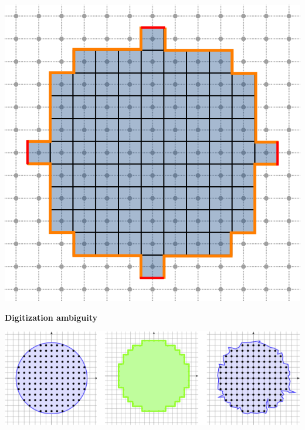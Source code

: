 \begin{frame}
\begin{minipage}{0.3\textwidth}
\includegraphics[scale=0.22]{figures/motivation/exact-sampling/digital-ball-perimeter.png}
\end{minipage}
\vspace{1em}
%
\pause
%
\textbf{Digitization ambiguity}
\begin{center}
\includegraphics[scale=1]{figures/motivation/exact-sampling/ambiguity.png}
\end{center}
\end{frame}

